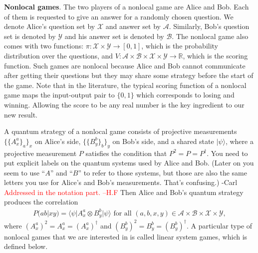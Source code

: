 \documentclass[11pt,letterpaper]{article}
\newcommand{\ket}[1]{|#1\rangle}
\newcommand{\bra}[1]{\langle#1|}
\newcommand{\ketbra}[2]{|#1\rangle\langle#2|}
\newcommand{\x}{\otimes}
\newcommand{\ct}{^{\dagger}}
\newcommand{\R}{\mathbb{R}}
\newcommand{\calX}{\mathcal{X}}
\newcommand{\calY}{\mathcal{Y}}
\newcommand{\calA}{\mathcal{A}}
\newcommand{\calB}{\mathcal{B}}
\newcommand{\1}{\mathbb{1}}
\newcommand{\EPR}[1]{\Sigma^{(#1)}}
\newcommand{\pr}[2]{P(#1|#2)}
\def\carl#1{{\color{blue} #1 -Carl}}
\newcommand{\hf}[1]{\textcolor{red}{#1}}
\theoremstyle{definition}
\begin{document}

\textbf{Nonlocal games}. 
The two players of a nonlocal game are Alice and Bob. Each of them is requested
to give an answer for a randomly chosen question. We denote Alice's question set by $\calX$ and answer set by $\calA$. Similarly,
Bob's question set is denoted by $\calY$ and his answer set is denoted by $\calB$. The nonlocal game also
comes with two functions: $\pi: \calX \times \calY \rightarrow [0,1]$, which is the probability distribution over the questions,
and $V: \calA \times \calB \times \calX \times \calY \rightarrow \R$, which is the scoring function. Such games are nonlocal
because Alice and Bob cannot communicate after getting their questions but they may share some strategy before 
the start of the game. Note that in the literature, the typical scoring function of a nonlocal game maps the input-output
pair to $\{0,1\}$ which corresponds to losing and winning. Allowing the score to be any real number is the key ingredient 
to our new result. 

A quantum strategy of a nonlocal game consists of projective measurements $\{\{A_x^a\}_a\}_x$ on Alice's side, 
$\{\{B_y^b\}_b\}_y$ on Bob's side, and a shared state $\ket{\psi}$, where a projective measurement $P$ satisfies
the condition that $P^2 = P = P\ct$.  \carl{You need to put explicit labels on the quantum systems used by
Alice and Bob.  (Later on you seem to use ``$A$'' and ``$B$'' to refer to those systems, but those are also
the same letters you use for Alice's and Bob's measurements.  That's confusing.)}
\hf{Addressed in the notation part. --H.F}
Then Alice and Bob's quantum strategy produces the correlation
\begin{align}
	\pr{ab}{xy} = \bra{\psi} A_x^a \x B_y^b \ket{\psi} \text{ for all } (a,b,x,y) \in \calA \times \calB \times \calX \times \calY,
\end{align}
where $(A_x^a)^2 = A_x^a = (A_x^a)^\dagger$ and $(B_y^b)^2 = B_y^b = (B_y^b)^\dagger$.
A particular type of nonlocal games that we are interested in is called linear system games, which is defined below.
\end{document}
